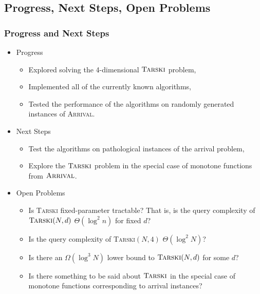 \documentclass{beamer}
\begin{document}
\subsection{Progress, Next Steps, Open Problems}
\newcommand{\pav}{Pálvölgyi}
\begin{frame}
\frametitle{Progress and Next Steps}
    \begin{itemize}
        \item Progress
        \begin{itemize}
            \item Explored solving the 4-dimensional $\textsc{Tarski}$ problem,
            \item Implemented all of the currently known algorithms,
            \item Tested the performance of the algorithms on randomly generated
              instances of \textsc{Arrival}.
        \end{itemize}
        \item Next Steps
        \begin{itemize}
            \item Test the algorithms on pathological instances of the arrival problem,
            \item Explore the $\textsc{Tarski}$ problem in the special case of monotone functions from
              $\textsc{Arrival}$.
        \end{itemize}
      \item Open Problems
        \begin{itemize}
          \item Is \textsc{Tarski} fixed-parameter tractable? That is, is the query complexity of $\textsc{Tarski}(N, d)$ $\Theta(\log^2n)$ for fixed $d$?
          \item Is the query complexity of \textsc{Tarski}$(N, 4)$ $\Theta(\log ^{2} N)$? 
          \item Is there an $\Omega(\log ^{3} N)$ lower bound to $\textsc{Tarski}(N, d)$ for some $d$?
          \item Is there something to be said about $\textsc{Tarski}$ in the special case of monotone functions
            corresponding to arrival instances?
        \end{itemize}
    \end{itemize}
\end{frame}
\end{document}
